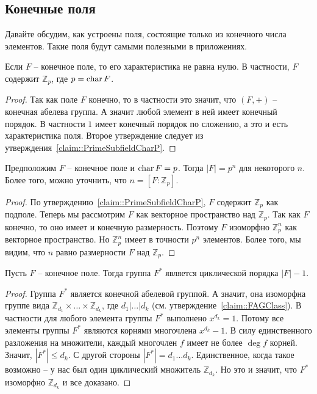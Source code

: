 \subsection{Конечные поля}

Давайте обсудим, как устроены поля, состоящие только из конечного числа элементов.
Такие поля будут самыми полезными в приложениях.

\begin{claim}
Если $F$ -- конечное поле, то его характеристика не равна нулю.
В частности, $F$ содержит $\mathbb Z_p$, где $p = \operatorname{char} F$.
\end{claim}
\begin{proof}
Так как поле $F$ конечно, то в частности это значит, что $(F, +)$ -- конечная абелева группа.
А значит любой элемент в ней имеет конечный порядок.
В частности $1$ имеет конечный порядок по сложению, а это и есть характеристика поля.
Второе утверждение следует из утверждения~\ref{claim::PrimeSubfieldCharP}.
\end{proof}

\begin{claim}
Предположим $F$ -- конечное поле и $\operatorname{char} F = p$.
Тогда $|F| = p^n$ для некоторого $n$.
Более того, можно уточнить, что $n = [F:\mathbb Z_p]$.
\end{claim}
\begin{proof}
По утверждению~\ref{claim::PrimeSubfieldCharP}, $F$ содержит $\mathbb Z_p$ как подполе.
Теперь мы рассмотрим $F$ как векторное пространство над $\mathbb Z_p$.
Так как $F$ конечно, то оно имеет и конечную размерность.
Поэтому $F$ изоморфно $\mathbb Z_p^n$ как векторное пространство.
Но $\mathbb Z_p^n$ имеет в точности $p^n$ элементов.
Более того, мы видим, что $n$ равно размерности $F$ над $\mathbb Z_p$.
\end{proof}

\begin{claim}
Пусть $F$ -- конечное поле.
Тогда группа $F^*$ является циклической порядка $|F| - 1$.
\end{claim}
\begin{proof}
Группа $F^*$ является конечной абелевой группой.
А значит, она изоморфна группе вида $\mathbb Z_{d_1}\times \ldots \times \mathbb Z_{d_k}$, где $d_1|\ldots |d_k$ (см. утверждение~\ref{claim::FAGClass}).
В частности для любого элемента группы $F^*$ выполнено $x^{d_k} = 1$.
Потому все элементы группы $F^*$ являются корнями многочлена $x^{d_k}-1$.
В силу единственного разложения на множители, каждый многочлен $f$ имеет не более $\deg f$ корней.
Значит, $|F^*|\leqslant d_k$.
С другой стороны $|F^*| = d_1\ldots d_k$.
Единственное, когда такое возможно -- у нас был один циклический множитель $\mathbb Z_{d_k}$.
Но это и значит, что $F^*$ изоморфно $\mathbb Z_{d_k}$ и все доказано.
\end{proof}

